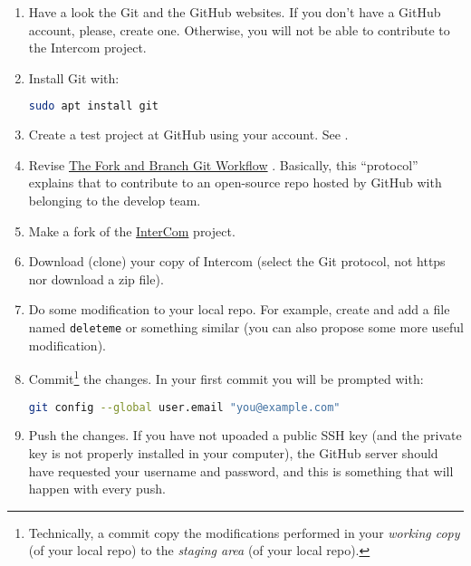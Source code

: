 \begin{enumerate}
\item Have a look the Git \cite{Git, Git-book} and the GitHub
  \cite{GitHub} websites. If you don't have a GitHub account, please,
  create one. Otherwise, you will not be able to contribute to the
  Intercom project.
\item Install Git with:
  \begin{lstlisting}[language=bash]
    sudo apt install git
  \end{lstlisting}
\item Create a test project at GitHub using your account. See
  \cite{GitHub-HW}.
  
\item Revise
  \href{https://github.com/vicente-gonzalez-ruiz/fork_and_branch_git_workflow}{The
    Fork and Branch Git Workflow} \cite{Git-workflow}. Basically, this
  ``protocol'' explains that to contribute to an open-source repo
  hosted by GitHub with belonging to the develop team.
  
\item Make a fork of the
  \href{https://github.com/Tecnologias-multimedia/intercom}{InterCom}
  project.
  
\item Download (clone) your copy of Intercom (select the Git protocol,
  not https nor download a zip file).

\item Do some modification to your local repo. For example, create and
  add a file named \texttt{deleteme} or something similar (you can
  also propose some more useful modification).
  
\item Commit\footnote{Technically, a commit copy the modifications
performed in your \emph{working copy} (of your local repo) to the
\emph{staging area} (of your local repo).} the changes. In your first
  commit you will be prompted with:

  \begin{lstlisting}[language=bash]
    git config --global user.email "you@example.com"
  \end{lstlisting}

\item Push the changes. If you have not upoaded a public
  SSH key (and the private key is not properly installed in your
  computer), the GitHub server should have requested your username and
  password, and this is something that will happen with every push.
  

\end{enumerate}
